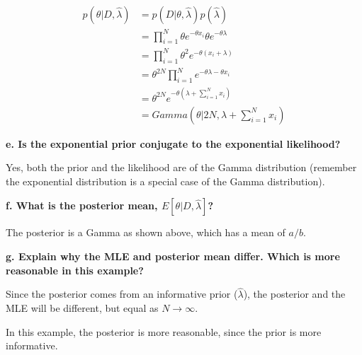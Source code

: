 {\begin{align}
    p(\theta|D,\hat{\lambda}) & = p(D|\theta,\hat{\lambda})p(\hat{\lambda}) \\
    & = \prod_{i=1}^{N} \theta e^{-\theta x_i} \theta e^{-\theta \lambda} \\
    & = \prod_{i=1}^{N} \theta^2 e^{-\theta (x_i + \lambda)} \\
    & = \theta^{2N} \prod_{i=1}^{N} e^{-\theta \lambda -\theta x_i} \\
    & = \theta^{2N} e^{-\theta (\lambda + \sum_{i=1}^{N} x_i)} \\
    & = Gamma(\theta|2N,\lambda + \sum_{i=1}^{N} x_i)
\end{align}

\textbf{e. Is the exponential prior conjugate to the exponential likelihood?}

Yes, both the prior and the likelihood are of the Gamma distribution (remember
the exponential distribution is a special case of the Gamma distribution).

\textbf{f. What is the posterior mean, $E[\theta|D, \hat{\lambda}]$?}

The posterior is a Gamma as shown above, which has a mean of $a/b$.

\textbf{g. Explain why the MLE and posterior mean differ. Which is more
reasonable in this example?}

Since the posterior comes from an informative prior ($\hat{\lambda}$), the
posterior and the MLE will be different, but equal as $N \rightarrow \infty$.

In this example, the posterior is more reasonable, since the prior is more
informative.

}

